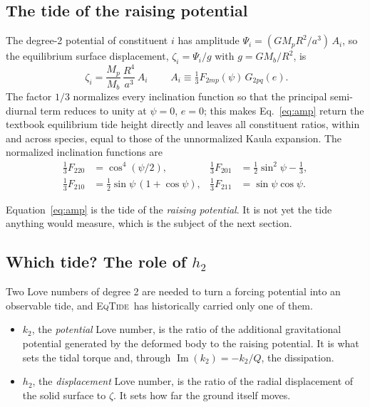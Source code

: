 \documentclass[11pt]{article}
\newcommand{\eqtide}{\textsc{EqTide}}
\begin{document}
\subsection{The tide of the raising potential}

The degree-2 potential of constituent $i$ has amplitude
$\Psi_i = (GM_pR^2/a^3)\,A_i$, so the equilibrium surface displacement,
$\zeta_i = \Psi_i/g$ with $g = GM_b/R^2$, is
\begin{equation}
  \boxed{\;
  \zeta_i = \frac{M_p}{M_b}\,\frac{R^4}{a^3}\,A_i \;}
  \qquad
  A_i \equiv \tfrac{1}{3}F_{2mp}(\psi)\,G_{2pq}(e).
  \label{eq:amp}
\end{equation}
The factor $1/3$ normalizes every inclination function so that the principal
semi-diurnal term reduces to unity at $\psi=0$, $e=0$; this makes
Eq.~\eqref{eq:amp} return the textbook equilibrium tide height directly and
leaves all constituent ratios, within and across species, equal to those of
the unnormalized Kaula expansion. The normalized inclination functions are
\begin{align}
  \tfrac13 F_{220} &= \cos^4(\psi/2), &
  \tfrac13 F_{201} &= \tfrac12\sin^2\psi - \tfrac13, \\
  \tfrac13 F_{210} &= \tfrac12\sin\psi\,(1+\cos\psi), &
  \tfrac13 F_{211} &= \sin\psi\cos\psi .
\end{align}

Equation~\eqref{eq:amp} is the tide of the \emph{raising potential}. It is not
yet the tide anything would measure, which is the subject of the next section.

\subsection{Which tide? The role of \texorpdfstring{$h_2$}{h2}}
\label{sec:h2}

Two Love numbers of degree 2 are needed to turn a forcing potential into an
observable tide, and \eqtide\ has historically carried only one of them.

\begin{itemize}
\item $k_2$, the \emph{potential} Love number, is the ratio of the additional
gravitational potential generated by the deformed body to the raising
potential. It is what sets the tidal torque and, through $\operatorname{Im}
(k_2) = -k_2/Q$, the dissipation.
\item $h_2$, the \emph{displacement} Love number, is the ratio of the radial
displacement of the solid surface to $\zeta$. It sets how far the ground
itself moves.
\end{itemize}
\end{document}
